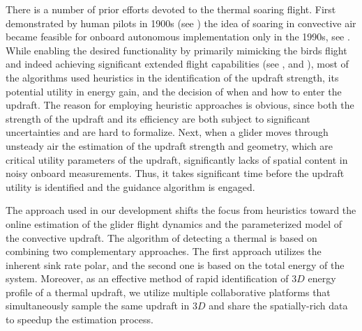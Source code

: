 \documentclass{ifacconf}
\begin{document}
There is a number of prior efforts devoted to the thermal soaring flight. First
demonstrated by human pilots in 1900s (see \cite{Simons:1998}) the idea of soaring in
convective air became feasible for onboard autonomous implementation only in the 1990s,
see \cite{Wharington:1998}. While enabling the desired functionality by primarily
mimicking the birds flight and indeed achieving significant extended flight capabilities
(see \cite{Edwards:2008}, \cite{Allen:2006} and \cite{Allen:2007}), most of the
algorithms used heuristics in the identification of the updraft strength, its potential
utility in energy gain, and the decision of when and how to enter the updraft. The reason
for employing heuristic approaches is obvious, since both the strength of the updraft and
its efficiency are both subject to significant uncertainties and are hard to formalize.
Next, when a glider moves through unsteady air the estimation of the updraft strength and
geometry, which are critical utility parameters of the updraft, significantly lacks of
spatial content in noisy onboard measurements. Thus, it takes significant time before the
updraft utility is identified and the guidance algorithm is engaged.
%

The approach used in our development shifts the focus from heuristics toward the online
estimation of the glider flight dynamics and the parameterized model of the convective
updraft. The algorithm of detecting a thermal is based on combining two complementary
approaches. The first approach utilizes the inherent sink rate polar, and the second one
is based on the total energy of the system. Moreover, as an effective method of rapid
identification of $3D$ energy profile of a thermal updraft, we utilize multiple
collaborative platforms that simultaneously sample the same updraft in $3D$ and share the
spatially-rich data to speedup the estimation process.

\end{document}
